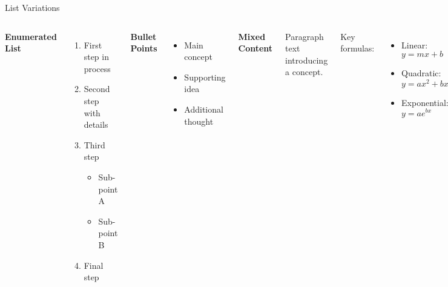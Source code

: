 \documentclass[8pt,aspectratio=169]{beamer}
\begin{document}
\begin{frame}[t]{List Variations}
\begin{columns}[T]
\textbf{Enumerated List}
\begin{enumerate}
\item First step in process
\item Second step with details
\item Third step
\begin{itemize}
\item Sub-point A
\item Sub-point B
\end{itemize}
\item Final step
\end{enumerate}

\vspace{0.5em}
\textbf{Bullet Points}
\begin{itemize}
\item Main concept
\item Supporting idea
\item Additional thought
\end{itemize}

\textbf{Mixed Content}

Paragraph text introducing a concept.

Key formulas:
\begin{itemize}
\item Linear: $y = mx + b$
\item Quadratic: $y = ax^2 + bx + c$
\item Exponential: $y = ae^{bx}$
\end{itemize}

Concluding remarks about the formulas and their applications in real-world scenarios.
\end{columns}
\end{frame}
\end{document}
